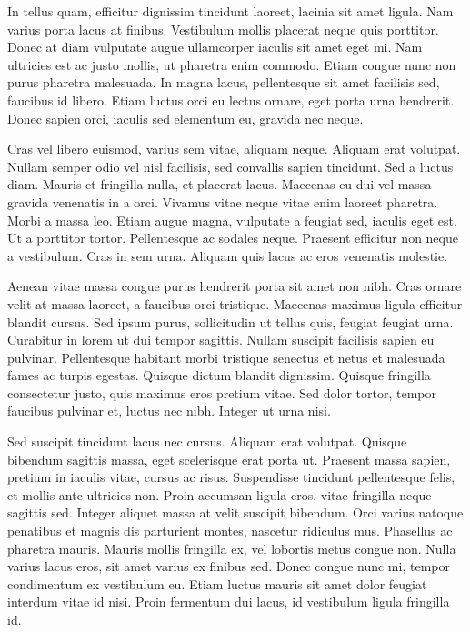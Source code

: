 In tellus quam, efficitur dignissim tincidunt laoreet, lacinia sit amet ligula. Nam varius porta lacus at finibus. Vestibulum mollis placerat neque quis porttitor. Donec at diam vulputate augue ullamcorper iaculis sit amet eget mi. Nam ultricies est ac justo mollis, ut pharetra enim commodo. Etiam congue nunc non purus pharetra malesuada. In magna lacus, pellentesque sit amet facilisis sed, faucibus id libero. Etiam luctus orci eu lectus ornare, eget porta urna hendrerit. Donec sapien orci, iaculis sed elementum eu, gravida nec neque.

Cras vel libero euismod, varius sem vitae, aliquam neque. Aliquam erat volutpat. Nullam semper odio vel nisl facilisis, sed convallis sapien tincidunt. Sed a luctus diam. Mauris et fringilla nulla, et placerat lacus. Maecenas eu dui vel massa gravida venenatis in a orci. Vivamus vitae neque vitae enim laoreet pharetra. Morbi a massa leo. Etiam augue magna, vulputate a feugiat sed, iaculis eget est. Ut a porttitor tortor. Pellentesque ac sodales neque. Praesent efficitur non neque a vestibulum. Cras in sem urna. Aliquam quis lacus ac eros venenatis molestie.

Aenean vitae massa congue purus hendrerit porta sit amet non nibh. Cras ornare velit at massa laoreet, a faucibus orci tristique. Maecenas maximus ligula efficitur blandit cursus. Sed ipsum purus, sollicitudin ut tellus quis, feugiat feugiat urna. Curabitur in lorem ut dui tempor sagittis. Nullam suscipit facilisis sapien eu pulvinar. Pellentesque habitant morbi tristique senectus et netus et malesuada fames ac turpis egestas. Quisque dictum blandit dignissim. Quisque fringilla consectetur justo, quis maximus eros pretium vitae. Sed dolor tortor, tempor faucibus pulvinar et, luctus nec nibh. Integer ut urna nisi.

Sed suscipit tincidunt lacus nec cursus. Aliquam erat volutpat. Quisque bibendum sagittis massa, eget scelerisque erat porta ut. Praesent massa sapien, pretium in iaculis vitae, cursus ac risus. Suspendisse tincidunt pellentesque felis, et mollis ante ultricies non. Proin accumsan ligula eros, vitae fringilla neque sagittis sed. Integer aliquet massa at velit suscipit bibendum. Orci varius natoque penatibus et magnis dis parturient montes, nascetur ridiculus mus. Phasellus ac pharetra mauris. Mauris mollis fringilla ex, vel lobortis metus congue non. Nulla varius lacus eros, sit amet varius ex finibus sed. Donec congue nunc mi, tempor condimentum ex vestibulum eu. Etiam luctus mauris sit amet dolor feugiat interdum vitae id nisi. Proin fermentum dui lacus, id vestibulum ligula fringilla id.

